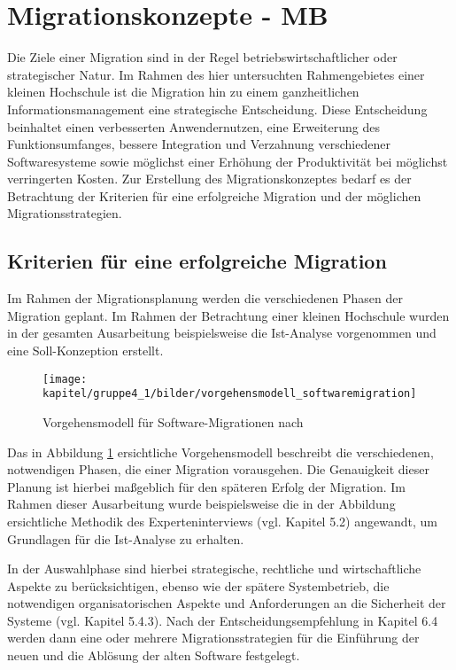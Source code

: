 \section{Migrationskonzepte - MB}
\label{section_migrationskonzepte}
Die Ziele einer Migration sind in der Regel betriebswirtschaftlicher oder strategischer Natur. Im Rahmen des hier untersuchten Rahmengebietes einer kleinen Hochschule ist die Migration hin zu einem ganzheitlichen Informationsmanagement eine strategische Entscheidung. Diese Entscheidung beinhaltet einen verbesserten Anwendernutzen, eine Erweiterung des Funktionsumfanges, bessere Integration und Verzahnung verschiedener Softwaresysteme sowie möglichst einer Erhöhung der Produktivität bei möglichst verringerten Kosten. Zur Erstellung des Migrationskonzeptes bedarf es der Betrachtung der Kriterien für eine erfolgreiche Migration und der möglichen Migrationsstrategien.

\subsection{Kriterien für eine erfolgreiche Migration}
Im Rahmen der Migrationsplanung werden die verschiedenen Phasen der Migration geplant. Im Rahmen der Betrachtung einer kleinen Hochschule wurden in der gesamten Ausarbeitung beispielsweise die Ist-Analyse vorgenommen und eine Soll-Konzeption erstellt.

\begin{figure}[h!]
	\centering
	\texttt{[image: kapitel/gruppe4\_1/bilder/vorgehensmodell\_softwaremigration]}
	\caption{Vorgehensmodell für Software-Migrationen nach \cite{migrationsleitfaden_2012}}
	\label{fig_vorgehensmodell_softwaremigration}	
\end{figure}

Das in Abbildung \ref{fig_vorgehensmodell_softwaremigration} ersichtliche Vorgehensmodell beschreibt die verschiedenen, notwendigen Phasen, die einer Migration vorausgehen. Die Genauigkeit dieser Planung ist hierbei maßgeblich für den späteren Erfolg der Migration. Im Rahmen dieser Ausarbeitung wurde beispielsweise die in der Abbildung ersichtliche Methodik des Experteninterviews (vgl. Kapitel 5.2) angewandt, um Grundlagen für die Ist-Analyse zu erhalten.

In der Auswahlphase sind hierbei strategische, rechtliche und wirtschaftliche Aspekte zu berücksichtigen, ebenso wie der spätere Systembetrieb, die notwendigen organisatorischen Aspekte und Anforderungen an die Sicherheit der Systeme (vgl. Kapitel 5.4.3). Nach der Entscheidungsempfehlung in Kapitel 6.4 werden dann eine oder mehrere Migrationsstrategien für die Einführung der neuen und die Ablösung der alten Software festgelegt.

